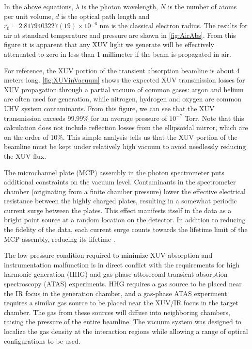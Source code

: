 In the above equations, $\lambda$ is the photon wavelength, $N$ is the number of atoms per unit volume, $d$ is the optical path length and $r_0=2.8179403227(19) \times 10^{-6} \text{ nm}$ is the classical electron radius. The results for air at standard temperature and pressure are shown in \cref{fig:AirAbs}. From this figure it is apparent that any XUV light we generate will be effectively attenuated to zero in less than 1 millimeter if the beam is propagated in air.

For reference, the XUV portion of the transient absorption beamline is about 4 meters long. \cref{fig:XUVinVacuum} shows the expected XUV transmission losses for XUV propagation through a partial vacuum of common gases: argon and helium are often used for generation, while nitrogen, hydrogen and oxygen are common UHV system contaminants. From this figure, we can see that the XUV transmission exceeds 99.99\% for an average pressure of $10^{-7}$ Torr. Note that this calculation does not include reflection losses from the ellipsoidal mirror, which are on the order of 10\%. This simple analysis tells us that the XUV portion of the beamline must be kept under relatively high vacuum to avoid needlessly reducing the XUV flux.

The microchannel plate (MCP) assembly in the photon spectrometer puts additional constraints on the vacuum level.  Contaminants in the spectrometer chamber (originating from a finite chamber pressure) lower the effective electrical resistance between the highly charged plates, resulting in a somewhat periodic current surge between the plates. This effect manifests itself in the data as a bright point source at a random location on the detector. In addition to reducing the fidelity of the data, each current surge counts towards the lifetime limit of the MCP assembly, reducing its lifetime \cite{ladislaswizaMicrochannelPlateDetectors1979}.

The low pressure condition required to minimize XUV absorption and instrumentation malfunction is in direct conflict with the requirements for high harmonic generation (HHG) and gas-phase attosecond transient absorption spectroscopy (ATAS) experiments. HHG requires a gas source to be placed near the IR focus in the generation chamber, and a gas-phase ATAS experiment requires a similar gas source to be placed near the XUV/IR focus in the target chamber. The gas from these sources will diffuse into neighboring chambers, raising the pressure of the entire beamline. The vacuum system was designed to localize the gas density at the interaction regions while allowing a range of optical configurations to be used.

